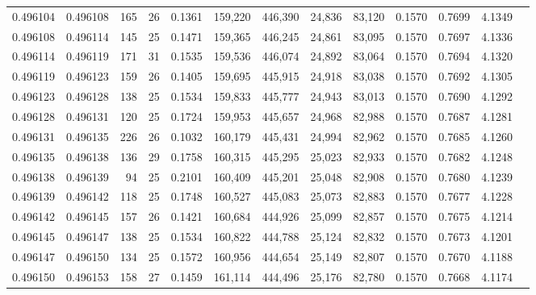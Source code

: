 \begin{tabular}{rrrrrrrrrrrrr}
0.496104 & 0.496108 & 165 &  26 &                                     0.1361 & 159,220 & 446,390 &  24,836 &  83,120 & 0.1570 & 0.7699 & 4.1349 \\
0.496108 & 0.496114 & 145 &  25 &                                     0.1471 & 159,365 & 446,245 &  24,861 &  83,095 & 0.1570 & 0.7697 & 4.1336 \\
0.496114 & 0.496119 & 171 &  31 &                                     0.1535 & 159,536 & 446,074 &  24,892 &  83,064 & 0.1570 & 0.7694 & 4.1320 \\
0.496119 & 0.496123 & 159 &  26 &                                     0.1405 & 159,695 & 445,915 &  24,918 &  83,038 & 0.1570 & 0.7692 & 4.1305 \\
0.496123 & 0.496128 & 138 &  25 &                                     0.1534 & 159,833 & 445,777 &  24,943 &  83,013 & 0.1570 & 0.7690 & 4.1292 \\
0.496128 & 0.496131 & 120 &  25 &                                     0.1724 & 159,953 & 445,657 &  24,968 &  82,988 & 0.1570 & 0.7687 & 4.1281 \\
0.496131 & 0.496135 & 226 &  26 &                                     0.1032 & 160,179 & 445,431 &  24,994 &  82,962 & 0.1570 & 0.7685 & 4.1260 \\
0.496135 & 0.496138 & 136 &  29 &                                     0.1758 & 160,315 & 445,295 &  25,023 &  82,933 & 0.1570 & 0.7682 & 4.1248 \\
0.496138 & 0.496139 &  94 &  25 &                                     0.2101 & 160,409 & 445,201 &  25,048 &  82,908 & 0.1570 & 0.7680 & 4.1239 \\
0.496139 & 0.496142 & 118 &  25 &                                     0.1748 & 160,527 & 445,083 &  25,073 &  82,883 & 0.1570 & 0.7677 & 4.1228 \\
0.496142 & 0.496145 & 157 &  26 &                                     0.1421 & 160,684 & 444,926 &  25,099 &  82,857 & 0.1570 & 0.7675 & 4.1214 \\
0.496145 & 0.496147 & 138 &  25 &                                     0.1534 & 160,822 & 444,788 &  25,124 &  82,832 & 0.1570 & 0.7673 & 4.1201 \\
0.496147 & 0.496150 & 134 &  25 &                                     0.1572 & 160,956 & 444,654 &  25,149 &  82,807 & 0.1570 & 0.7670 & 4.1188 \\
0.496150 & 0.496153 & 158 &  27 &                                     0.1459 & 161,114 & 444,496 &  25,176 &  82,780 & 0.1570 & 0.7668 & 4.1174 \\

\end{tabular}
